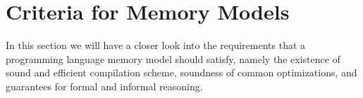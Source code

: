 \section{Criteria for Memory Models}
\label{sec:background}

In this section we will have a closer look into the requirements 
that a programming language memory model should satisfy, 
namely the existence of sound and efficient compilation scheme, 
soundness of common optimizations, and guarantees for formal and informal reasoning.  










